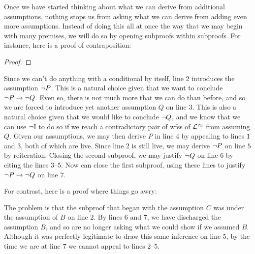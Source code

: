 Once we have started thinking about what we can derive from additional assumptions, nothing stops us from asking what we can derive from adding even more assumptions.
Instead of doing this all at once the way that we may begin with many premises, we will do so by opening subproofs within subproofs.
For instance, here is a proof of contraposition:

\begin{proof}
     
  \open
     
    \open
       
    \close
     
  \close
\end{proof}

Since we can't do anything with a conditional by itself, line $2$ introduces the assumption $\neg P$.
This is a natural choice given that we want to conclude $\neg P \rightarrow \neg Q$.
Even so, there is not much more that we can do than before, and so we are forced to introduce yet another assumption $Q$ on line $3$. 
This is also a natural choice given that we would like to conclude $\neg Q$, and we know that we can use $\neg$I to do so if we reach a contradictory pair of wfss of $\mathcal{L}^{\textsc{pl}}$ from assuming $Q$.
Given our assumptions, we may then derive $P$ in line $4$ by appealing to lines $1$ and $3$, both of which are live. 
Since line $2$ is still live, we may derive $\neg P$ on line $5$ by reiteration.
Closing the second subproof, we may justify $\neg Q$ on line $6$ by citing the lines $3$--$5$.
Now can close the first subproof, using these lines to justify $\neg P \rightarrow \neg Q$ on line $7$. 


For contrast, here is a proof where things go awry:
\begin{fitchproof}
 \pr{}
\open
	 
	\open
		 
	\close
\close
{}
\end{fitchproof}
The problem is that the subproof that began with the assumption $C$ was under the assumption of $B$ on line $2$.
By lines $6$ and $7$, we have discharged the assumption $B$, and so are no longer asking what we could show if we assumed $B$.
Although it was perfectly legitimate to draw this same inference on line $5$, by the time we are at line $7$ we cannot appeal to lines $2$--$5$.

